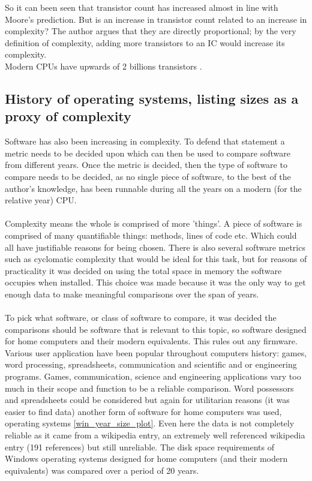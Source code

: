 So it can been seen that transistor count has increased almost in line with Moore's prediction. But is an increase in transistor count related to an increase in complexity? The author argues that they are directly proportional; by the very definition of complexity, adding more transistors to an IC would increase its complexity. \\

Modern CPUs have upwards of 2 billions transistors \cite{2Bbeast}.

\subsection{History of operating systems, listing sizes as a proxy of complexity}
Software has also been increasing in complexity. To defend that statement a metric needs to be decided upon which can then be used to compare software from different years. Once the metric is decided, then the type of software to compare needs to be decided, as no single piece of software, to the best of the author's knowledge, has been runnable during all the years on a modern (for the relative year) CPU. \\\\

Complexity means the whole is comprised of more 'things'. A piece of software is comprised of many quantifiable things: methods, lines of code etc. Which could all have justifiable reasons for being chosen. There is also several software metrics such as cyclomatic complexity that would be ideal for this task, but for reasons of practicality it was decided on using the total space in memory the software occupies when installed. This choice was made because it was the only way to get enough data to make meaningful comparisons over the span of years.\\\\

To pick what software, or class of software to compare, it was decided the comparisons should be software that is relevant to this topic, so software designed for home computers and their modern equivalents. This rules out any firmware. Various user application have been popular throughout computers history: games, word processing, spreadsheets, communication and scientific and or engineering  programs. Games, communication, science and engineering applications vary too much in their scope and function to be a reliable comparison. Word possessors and spreadsheets could be considered but again for utilitarian reasons (it was easier to find data) another form of software for home computers was used, operating systems \ref{win_year_size_plot}. Even here the data is not completely reliable as it came from a wikipedia entry, an extremely well referenced wikipedia entry (191 references) but still unreliable. The disk space requirements of Windows operating systems designed for home computers (and their modern equivalents) was compared over a period of 20 years.\\\\

